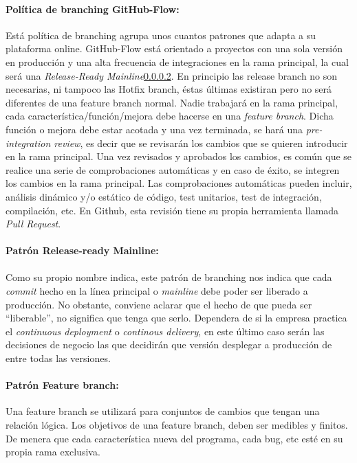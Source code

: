 \paragraph{Política de branching GitHub-Flow:} Está política de branching agrupa unos
cuantos patrones que adapta a su plataforma online. GitHub-Flow está orientado a proyectos
con una sola versión en producción y una alta frecuencia de integraciones en la rama
principal, la cual será una \emph{Release-Ready Mainline}\ref{sec:release-ready}. En
principio las release branch no son necesarias, ni tampoco las Hotfix branch, éstas
últimas existiran pero no será diferentes de una feature branch normal. Nadie trabajará
en la rama principal, cada característica/función/mejora debe hacerse en una \emph{feature
branch}. Dicha función o mejora debe estar acotada y una vez terminada, se hará una
\emph{pre-integration review}, es decir que se revisarán los cambios que se quieren
introducir en la rama principal. Una vez revisados y aprobados los cambios, es común
que se realice una serie de comprobaciones automáticas y en caso de éxito, se integren
los cambios en la rama principal. Las comprobaciones automáticas pueden incluir, análisis
dinámico y/o estático de código, test unitarios, test de integración, compilación, etc.
En Github, esta revisión tiene su propia herramienta llamada \emph{Pull Request}.

\paragraph{Patrón Release-ready Mainline:}\label{sec:release-ready}

\paragraph{}Como su propio nombre indica, este patrón de branching nos indica que cada
\emph{commit} hecho en la línea principal o \emph{mainline} debe poder ser liberado a
producción. No obstante, conviene aclarar que el hecho de que pueda ser ``liberable'',
no significa que tenga que serlo. Dependera de si la empresa practica el \emph{continuous
deployment} o \emph{continous delivery}, en este último caso serán las decisiones de
negocio las que decidirán que versión desplegar a producción de entre todas las versiones.


\paragraph{Patrón Feature branch:} Una feature branch se utilizará para conjuntos de
cambios que tengan una relación lógica. Los objetivos de una feature branch, deben ser
medibles y finitos. De menera que cada característica nueva del programa, cada bug, etc
esté en su propia rama exclusiva.

